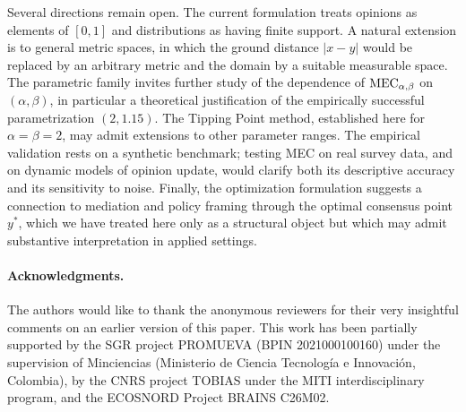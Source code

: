 Several directions remain open. The current formulation treats opinions
as elements of $[0,1]$ and distributions as having finite support. A
natural extension is to general metric spaces, in which the ground
distance $|x-y|$ would be replaced by an arbitrary metric and the
domain by a suitable measurable space. The parametric family invites
further study of the dependence of $\MEC$ on $(\alpha,\beta)$, in
particular a theoretical justification of the empirically successful
parametrization $(2,1.15)$. The Tipping Point method, established here
for $\alpha=\beta=2$, may admit extensions to other parameter ranges.
The empirical validation rests on a synthetic benchmark; testing MEC
on real survey data, and on dynamic models of opinion update, would
clarify both its descriptive accuracy and its sensitivity to noise.
Finally, the optimization formulation suggests a connection to
mediation and policy framing through the optimal consensus point
$y^*$, which we have treated here only as a structural object but
which may admit substantive interpretation in applied settings.

\paragraph{Acknowledgments.}
The authors would like to thank the anonymous reviewers for their very
insightful comments on an earlier version of this paper.  This work
has been partially supported by the SGR project PROMUEVA (BPIN
2021000100160) under the supervision of Minciencias (Ministerio de
Ciencia Tecnolog\'ia e Innovaci\'on, Colombia),  by the CNRS project TOBIAS under the MITI interdisciplinary program, and the ECOSNORD Project BRAINS C26M02. 
